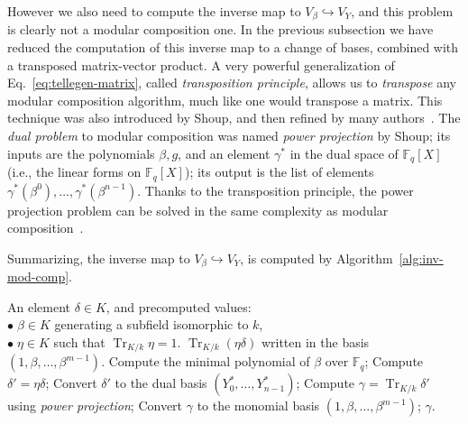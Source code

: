 \documentclass[12pt]{article}
\theoremstyle{plain}
\theoremstyle{definition}
\DeclareMathOperator{\trace}{Tr} %
\def\F{\ensuremath{\mathbb{F}}}
\newcounter{algorithm}
\begin{document}
However we also need to compute the inverse map to
$V_\beta\hookrightarrow V_Y$, and this problem is clearly not a
modular composition one. %
In the previous subsection we have reduced the computation of this
inverse map to a change of bases, combined with a transposed
matrix-vector product. %
A very powerful generalization of Eq.~\eqref{eq:tellegen-matrix},
called \emph{transposition principle}, allows us to \emph{transpose}
any modular composition algorithm, much like one would transpose a
matrix. %
This technique was also introduced by Shoup, and then refined by many
authors~\cite{bostan+lecerf+schost:tellegen,df+schost10,df+thesis}. %
The \emph{dual problem} to modular composition was named \emph{power
  projection} by Shoup; its inputs are the polynomials $\beta,g$, and
an element $\gamma^*$ in the dual space of $\F_q[X]$ (i.e., the linear
forms on $\F_q[X]$); its output is the list of elements
$\gamma^*(\beta^0),\dots,\gamma^*(\beta^{n-1})$. %
Thanks to the transposition principle, the power projection problem
can be solved in the same complexity as modular
composition~\cite{shoup95,kedlaya+umans08}.

Summarizing, the inverse map to $V_\beta\hookrightarrow V_Y$, is
computed by Algorithm~\ref{alg:inv-mod-comp}.

\begin{algorithm}
    \label{alg:inv-mod-comp}
    \begin{algorithmic}[1]
      \REQUIRE An element $\delta\in K$, and precomputed values:\\
      $\bullet\;\beta\in K$ generating a subfield isomorphic to $k$,\\
      $\bullet\;\eta\in K$ such that $\trace_{K/k}\eta=1$.
      \ENSURE $\trace_{K/k}(\eta\delta)$ written in the basis $(1,\beta,\dots,\beta^{m-1})$.
      \STATE Compute the minimal polynomial of $\beta$ over $\F_q$;
      \STATE Compute $\delta'=\eta\delta$;
      \STATE Convert $\delta'$ to the dual basis $(Y_0^*,\dots,Y_{n-1}^*)$;
      \STATE Compute $\gamma=\trace_{K/k}\delta'$ using \emph{power projection};
      \STATE Convert $\gamma$ to the monomial basis $(1,\beta,\dots,\beta^{m-1})$;
      \RETURN $\gamma$.
    \end{algorithmic}
\end{algorithm}
\end{document}
